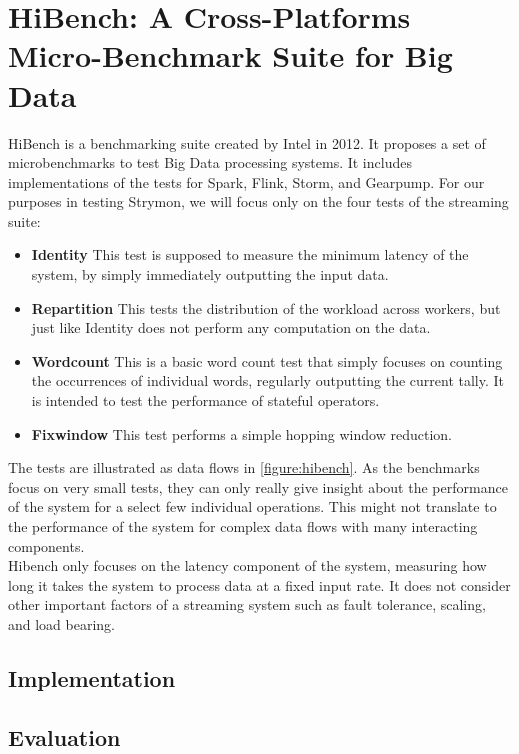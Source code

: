 \section{HiBench: A Cross-Platforms Micro-Benchmark Suite for Big Data\cite{hibench}}
HiBench is a benchmarking suite created by Intel in 2012. It proposes a set of microbenchmarks to test Big Data processing systems. It includes implementations of the tests for Spark, Flink, Storm, and Gearpump. For our purposes in testing Strymon, we will focus only on the four tests of the streaming suite:

\begin{itemize}
\item {\bfseries Identity} This test is supposed to measure the minimum latency of the system, by simply immediately outputting the input data.
\item {\bfseries Repartition} This tests the distribution of the workload across workers, but just like Identity does not perform any computation on the data.
\item {\bfseries Wordcount} This is a basic word count test that simply focuses on counting the occurrences of individual words, regularly outputting the current tally. It is intended to test the performance of stateful operators.
\item {\bfseries Fixwindow} This test performs a simple hopping window reduction.
\end{itemize}

The tests are illustrated as data flows in \autoref{figure:hibench}. As the benchmarks focus on very small tests, they can only really give insight about the performance of the system for a select few individual operations. This might not translate to the performance of the system for complex data flows with many interacting components. \\

Hibench only focuses on the latency component of the system, measuring how long it takes the system to process data at a fixed input rate. It does not consider other important factors of a streaming system such as fault tolerance, scaling, and load bearing.


\subsection{Implementation}


\subsection{Evaluation}


